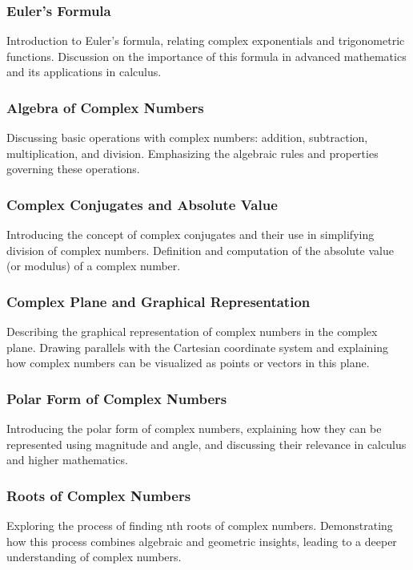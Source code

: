 \documentclass[a4paper,12pt]{book}
\begin{document}
\subsubsection{Euler's Formula}
Introduction to Euler's formula, relating complex exponentials and trigonometric functions. Discussion on the importance of this formula in advanced mathematics and its applications in calculus.


\subsubsection{Algebra of Complex Numbers}
Discussing basic operations with complex numbers: addition, subtraction, multiplication, and division. Emphasizing the algebraic rules and properties governing these operations.

\subsubsection{Complex Conjugates and Absolute Value}
Introducing the concept of complex conjugates and their use in simplifying division of complex numbers. Definition and computation of the absolute value (or modulus) of a complex number.

\subsubsection{Complex Plane and Graphical Representation}
Describing the graphical representation of complex numbers in the complex plane. Drawing parallels with the Cartesian coordinate system and explaining how complex numbers can be visualized as points or vectors in this plane.

\subsubsection{Polar Form of Complex Numbers}
Introducing the polar form of complex numbers, explaining how they can be represented using magnitude and angle, and discussing their relevance in calculus and higher mathematics.

\subsubsection{Roots of Complex Numbers}
Exploring the process of finding nth roots of complex numbers. Demonstrating how this process combines algebraic and geometric insights, leading to a deeper understanding of complex numbers.
\end{document}
